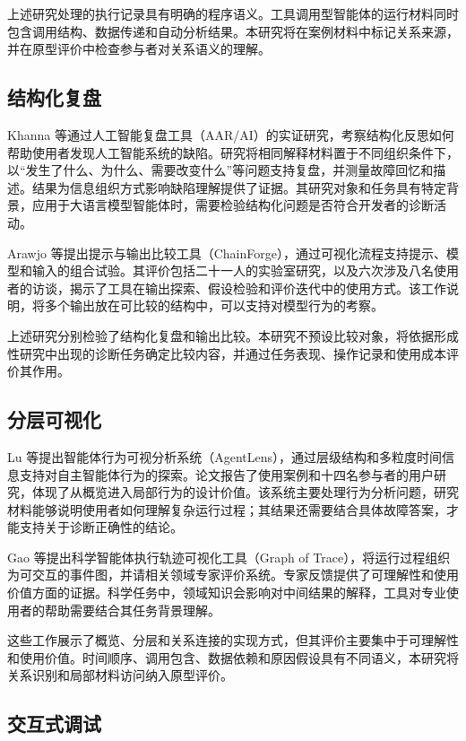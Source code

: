 上述研究处理的执行记录具有明确的程序语义。工具调用型智能体的运行材料同时包含调用结构、数据传递和自动分析结果。本研究将在案例材料中标记关系来源，并在原型评价中检查参与者对关系语义的理解。

\subsection{结构化复盘}

Khanna 等\cite{ref04}通过人工智能复盘工具（AAR/AI）的实证研究，考察结构化反思如何帮助使用者发现人工智能系统的缺陷。研究将相同解释材料置于不同组织条件下，以“发生了什么、为什么、需要改变什么”等问题支持复盘，并测量故障回忆和描述。结果为信息组织方式影响缺陷理解提供了证据。其研究对象和任务具有特定背景，应用于大语言模型智能体时，需要检验结构化问题是否符合开发者的诊断活动。

Arawjo 等\cite{arawjo2024chainforge}提出提示与输出比较工具（ChainForge），通过可视化流程支持提示、模型和输入的组合试验。其评价包括二十一人的实验室研究，以及六次涉及八名使用者的访谈，揭示了工具在输出探索、假设检验和评价迭代中的使用方式。该工作说明，将多个输出放在可比较的结构中，可以支持对模型行为的考察。

上述研究分别检验了结构化复盘和输出比较。本研究不预设比较对象，将依据形成性研究中出现的诊断任务确定比较内容，并通过任务表现、操作记录和使用成本评价其作用。

\subsection{分层可视化}

Lu 等\cite{ref22}提出智能体行为可视分析系统（AgentLens），通过层级结构和多粒度时间信息支持对自主智能体行为的探索。论文报告了使用案例和十四名参与者的用户研究，体现了从概览进入局部行为的设计价值。该系统主要处理行为分析问题，研究材料能够说明使用者如何理解复杂运行过程；其结果还需要结合具体故障答案，才能支持关于诊断正确性的结论。

Gao 等\cite{ref24}提出科学智能体执行轨迹可视化工具（Graph of Trace），将运行过程组织为可交互的事件图，并请相关领域专家评价系统。专家反馈提供了可理解性和使用价值方面的证据。科学任务中，领域知识会影响对中间结果的解释，工具对专业使用者的帮助需要结合其任务背景理解。

这些工作展示了概览、分层和关系连接的实现方式，但其评价主要集中于可理解性和使用价值。时间顺序、调用包含、数据依赖和原因假设具有不同语义，本研究将关系识别和局部材料访问纳入原型评价。

\subsection{交互式调试}

